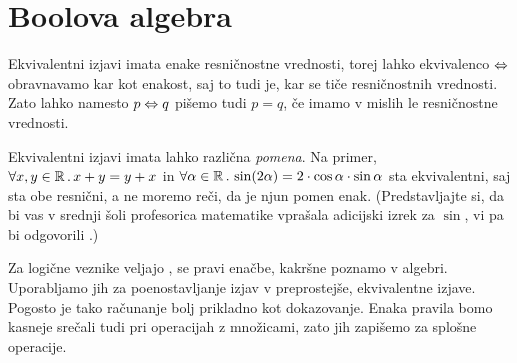 \section{Boolova algebra}
\label{sec:boolova-algebra}

Ekvivalentni izjavi imata enake resničnostne vrednosti, torej lahko ekvivalenco
$\Leftrightarrow$ obravnavamo kar kot enakost, saj to tudi je, kar se tiče resničnostnih
vrednosti. Zato lahko namesto $p \Leftrightarrow q$ pišemo tudi $p = q$, če imamo v mislih le
resničnostne vrednosti.

\begin{opomba}
  Ekvivalentni izjavi imata lahko različna \emph{pomena}. Na primer,
  $\forall x, y \in \mathbb{R} \,.\, x + y = y + x$ in
  $\forall \alpha \in \mathbb{R} \,.\, \sin(2 \alpha) = 2 \cdot \cos \alpha \cdot \sin \alpha$ sta
  ekvivalentni, saj sta obe resnični, a ne moremo reči, da je njun pomen enak. (Predstavljajte si, da bi vas v srednji šoli profesorica matematike vprašala adicijski izrek za $\sin$, vi pa bi odgovorili .)
\end{opomba}


Za logične veznike veljajo , se pravi enačbe, kakršne poznamo v algebri. Uporabljamo jih za poenostavljanje izjav v preprostejše, ekvivalentne izjave. Pogosto je tako računanje bolj prikladno kot dokazovanje.
%
Enaka pravila bomo kasneje srečali tudi pri operacijah z množicami, zato jih zapišemo za splošne operacije.

